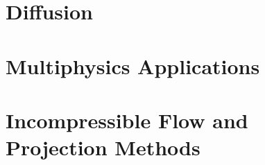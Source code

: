 \documentclass[11pt]{book}
\begin{document}


\chapter{Diffusion}



\chapter{Multiphysics Applications}



\chapter{Incompressible Flow and Projection Methods}



\backmatter




\end{document}
